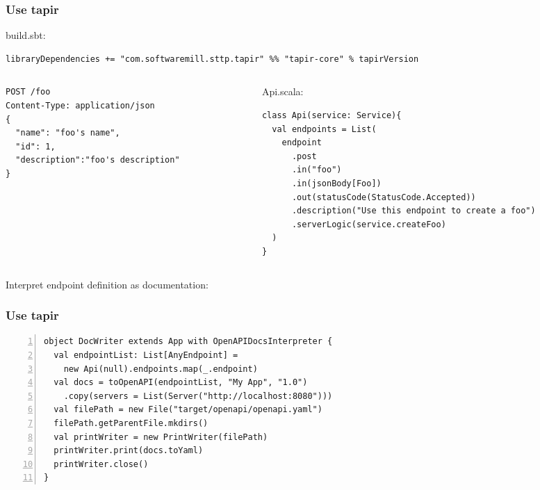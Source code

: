 \documentclass[aspectratio=169]{beamer}
\begin{document}
\begin{frame}[fragile]
  \frametitle{Use tapir}
build.sbt:
\begin{lstlisting}[style=myScalaStyle,frame=none]
libraryDependencies += "com.softwaremill.sttp.tapir" %% "tapir-core" % tapirVersion
\end{lstlisting}
\pause
\begin{columns}
\begin{column}{0.4\textwidth}
\begin{lstlisting}[style=myScalaStyle,frame=none]
POST /foo
Content-Type: application/json
{
  "name": "foo's name", 
  "id": 1,
  "description":"foo's description"
}
\end{lstlisting}
\end{column}
\pause
\begin{column}{0.6\textwidth}
Api.scala:
\begin{lstlisting}[style=myScalaStyle,frame=none]
class Api(service: Service){
  val endpoints = List(
    endpoint
      .post
      .in("foo")
      .in(jsonBody[Foo])
      .out(statusCode(StatusCode.Accepted))
      .description("Use this endpoint to create a foo")
      .serverLogic(service.createFoo)
  )
}

\end{lstlisting}
\end{column}
\end{columns}

\end{frame}

\begin{frame}[fragile]
Interpret endpoint definition as documentation:

\frametitle{Use tapir}
\begin{lstlisting}[style=myScalaStyle,frame=none,numbers=left]
object DocWriter extends App with OpenAPIDocsInterpreter {
  val endpointList: List[AnyEndpoint] =
    new Api(null).endpoints.map(_.endpoint)
  val docs = toOpenAPI(endpointList, "My App", "1.0")
    .copy(servers = List(Server("http://localhost:8080")))
  val filePath = new File("target/openapi/openapi.yaml")
  filePath.getParentFile.mkdirs()
  val printWriter = new PrintWriter(filePath)
  printWriter.print(docs.toYaml)
  printWriter.close()
}

\end{lstlisting}


\end{frame}
\end{document}
